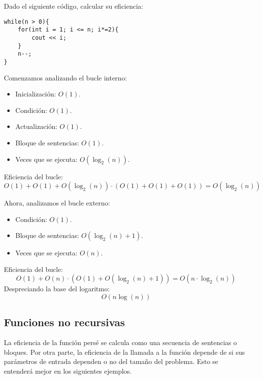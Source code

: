 \begin{ejemplo}
Dado el siguiente código, calcular su eficiencia:
\begin{listing}[H]
\begin{verbatim}
while(n > 0){
    for(int i = 1; i <= n; i*=2){
        cout << i;
    }
    n--;
}
\end{verbatim}
\end{listing}
Comenzamos analizando el bucle interno:
\begin{itemize}
\item Inicialización: $O(1)$.
\item Condición: $O(1)$.
\item Actualización: $O(1)$.
\item Bloque de sentencias: $O(1)$.
\item Veces que se ejecuta: $O(\log_2(n))$.
\end{itemize}
  
Eficiencia del bucle:
\begin{equation*}
O(1)+O(1)+O(\log_2(n))\cdot (O(1)+O(1)+O(1)) = O(\log_2(n))
\end{equation*}
  
Ahora, analizamos el bucle externo:
\begin{itemize}
\item Condición: $O(1)$.
\item Bloque de sentencias: $O(\log_2(n)+1)$.
\item Veces que se ejecuta: $O(n)$.
\end{itemize}
  
Eficiencia del bucle:
\begin{equation*}
O(1)+O(n)\cdot (O(1)+O(\log_2(n)+1)) = O(n\cdot \log_2(n))
\end{equation*}
Despreciando la base del logaritmo:
\begin{equation*}
O(n\log(n))
\end{equation*}
\end{ejemplo}

\subsection{Funciones no recursivas}
La eficiencia de la función persé se calcula como una secuencia de sentencias o bloques. Por otra parte, la eficiencia de la llamada a la función depende de si sus parámetros de entrada dependen o no del tamaño del problema. Esto se entenderá mejor en los siguientes ejemplos.

